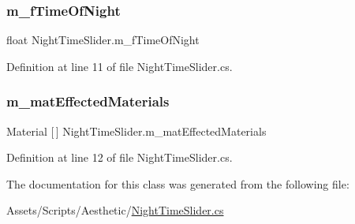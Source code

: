 \subsubsection{\texorpdfstring{m\+\_\+f\+Time\+Of\+Night}{m\_fTimeOfNight}}
{\footnotesize\ttfamily float Night\+Time\+Slider.\+m\+\_\+f\+Time\+Of\+Night}



Definition at line 11 of file Night\+Time\+Slider.\+cs.

\mbox{\label{class_night_time_slider_af42bb88d5354f004f2d79547bc6bdd4b}} 
\subsubsection{\texorpdfstring{m\+\_\+mat\+Effected\+Materials}{m\_matEffectedMaterials}}
{\footnotesize\ttfamily Material \mbox{[}$\,$\mbox{]} Night\+Time\+Slider.\+m\+\_\+mat\+Effected\+Materials}



Definition at line 12 of file Night\+Time\+Slider.\+cs.



The documentation for this class was generated from the following file\+:\begin{DoxyCompactItemize}
\item 
Assets/\+Scripts/\+Aesthetic/\mbox{\hyperlink{_night_time_slider_8cs}{Night\+Time\+Slider.\+cs}}\end{DoxyCompactItemize}
